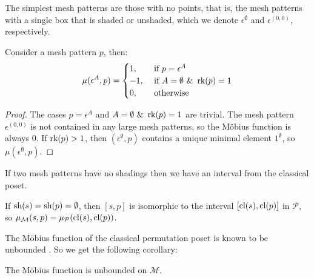 \documentclass[11pt,a4paper,oneside]{article}
\begin{document}
The simplest mesh patterns are those with no points, that is, the mesh patterns with a single box that is shaded or unshaded, which we denote $\epsilon^\emptyset$ and $\epsilon^{(0,0)}$, respectively.
\begin{lem}
Consider a mesh pattern $p$, then:
$$\mu(\epsilon^{A},p)=\begin{cases}
1,&\mbox{ if }p=\epsilon^A \\
-1,&\mbox{ if }A=\emptyset\,\,\&\,\,\operatorname{\textrm{rk}}(p)=1\\
0,&\mbox{ otherwise}
\end{cases}$$
\begin{proof}
The cases $p=\epsilon^A$ and $A=\emptyset\,\,\&\,\,\operatorname{\textrm{rk}}(p)=1$ are trivial. The mesh pattern $\epsilon^{(0,0)}$ is not contained in any large mesh patterns, so the M\"obius function is always $0$. If $\operatorname{\textrm{rk}}(p)>1$, then $(\epsilon^\emptyset,p)$ contains a unique minimal element $1^\emptyset$, so $\mu(\epsilon^\emptyset,p)$.
\end{proof}
\end{lem}

If two mesh patterns have no shadings then we have an interval from the classical poset.
\begin{lem}
If $\operatorname{\textrm{sh}}(s)=\operatorname{\textrm{sh}}(p)=\emptyset$, then $[s,p]$ is isomorphic to the interval $[\operatorname{\textrm{cl}}(s),\operatorname{\textrm{cl}}(p)]$ in $\mathcal{P}$, so $\operatorname{\mu_\mathcal{M}}(s,p)=\operatorname{\mu_\mathcal{P}}(\operatorname{\textrm{cl}}(s),\operatorname{\textrm{cl}}(p))$.
\end{lem}
The M\"obius function of the classical permutation poset is known to be unbounded \cite{Smith13}. So we get the following corollary:
\begin{cor}
The M\"obius function is unbounded on $\mathcal{M}$.
\end{cor}
\end{document}
